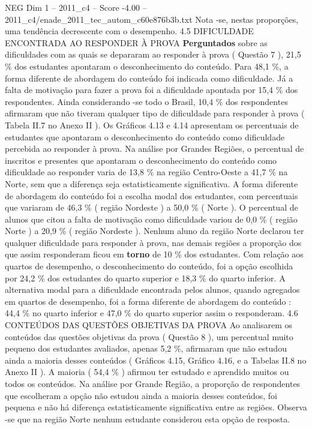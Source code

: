 \begin{textsample}{NEG Dim 1 – 2011\_c4 – Score -4.00 – 2011\_c4/enade\_2011\_tec\_autom\_c60e876b3b.txt}
Nota -se, nestas proporções, uma tendência decrescente com o desempenho. 4.5 DIFICULDADE ENCONTRADA AO RESPONDER À PROVA \textbf{Perguntados} sobre as dificuldades com as quais se depararam ao responder à prova ( Questão 7 ), 21,5 \% dos estudantes apontaram o desconhecimento do conteúdo.
Para 48,1 \%, a forma diferente de abordagem do conteúdo foi indicada como dificuldade.
Já a falta de motivação para fazer a prova foi a dificuldade apontada por 15,4 \% dos respondentes.
Ainda considerando -se todo o Brasil, 10,4 \% dos respondentes afirmaram que não tiveram qualquer tipo de dificuldade para responder à prova ( Tabela II.7 no Anexo II ).
Os Gráficos 4.13 e 4.14 apresentam os percentuais de estudantes que apontaram o desconhecimento do conteúdo como dificuldade percebida ao responder à prova.
Na análise por Grandes Regiões, o percentual de inscritos e presentes que apontaram o desconhecimento do conteúdo como dificuldade ao responder varia de 13,8 \% na região Centro-Oeste a 41,7 \% na Norte, sem que a diferença seja estatisticamente significativa.
A forma diferente de abordagem do conteúdo foi a escolha modal dos estudantes, com percentuais que variaram de 46,3 \% ( região Nordeste ) a 50,0 \% ( Norte ).
O percentual de alunos que citou a falta de motivação como dificuldade variou de 0,0 \% ( região Norte ) a 20,9 \% ( região Nordeste ).
Nenhum aluno da região Norte declarou ter qualquer dificuldade para responder à prova, nas demais regiões a proporção dos que assim responderam ficou em \textbf{torno} de 10 \% dos estudantes.
Com relação aos quartos de desempenho, o desconhecimento do conteúdo, foi a opção escolhida por 24,2 \% dos estudantes do quarto superior e 18,3 \% do quarto inferior.
A alternativa modal para a dificuldade encontrada pelos alunos, quando agregados em quartos de desempenho, foi a forma diferente de abordagem do conteúdo : 44,4 \% no quarto inferior e 47,0 \% do quarto superior assim o responderam. 4.6 CONTEÚDOS DAS QUESTÕES OBJETIVAS DA PROVA Ao analisarem os conteúdos das questões objetivas da prova ( Questão 8 ), um percentual muito pequeno dos estudantes avaliados, apenas 5,2 \%, afirmaram que não estudou ainda a maioria desses conteúdos ( Gráficos 4.15, Gráfico 4.16, e a Tabelas II.8 no Anexo II ).
A maioria ( 54,4 \% ) afirmou ter estudado e aprendido muitos ou todos os conteúdos.
Na análise por Grande Região, a proporção de respondentes que escolheram a opção não estudou ainda a maioria desses conteúdos, foi pequena e não há diferença estatisticamente significativa entre as regiões.
Observa -se que na região Norte nenhum estudante considerou esta opção de resposta.

\end{textsample}
